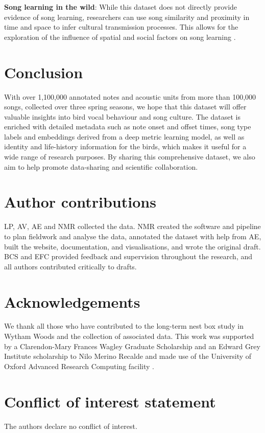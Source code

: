 \textbf{Song learning in the wild}: While this dataset does not directly provide evidence of song learning, researchers can use song similarity and proximity in time and space to infer cultural transmission processes. This allows for the exploration of the influence of spatial and social factors on song learning \parencite{james2020, Lachlan2003, nelson2014, Peters2017, wheelwright2008}.


\section{Conclusion}

With over 1,100,000 annotated notes and acoustic units from more than 100,000 songs, collected over three spring seasons, we hope that this dataset will offer valuable insights into bird vocal behaviour and song culture. The dataset is enriched with detailed metadata such as note onset and offset times, song type labels and embeddings derived from a deep metric learning model, as well as identity and life-history information for the birds, which makes it useful for a wide range of research purposes. By sharing this comprehensive dataset, we also aim to help promote data-sharing and scientific collaboration.

\section{Author contributions}

LP, AV, AE and NMR collected the data. NMR created the software and pipeline to plan fieldwork and analyse the data, annotated the dataset with help from AE, built the website, documentation, and visualisations, and wrote the original draft. BCS and EFC provided feedback and supervision throughout the research, and all authors contributed critically to drafts.

\section{Acknowledgements}
We thank all those who have contributed to the long-term nest box study in Wytham Woods and the collection of associated data.
This work was supported by a Clarendon-Mary Frances Wagley Graduate Scholarship
and an Edward Grey Institute scholarship to Nilo Merino Recalde and made use of the University of Oxford Advanced Research Computing facility \parencite{richards2015}.

\section{Conflict of interest statement}
The authors declare no conflict of interest.

